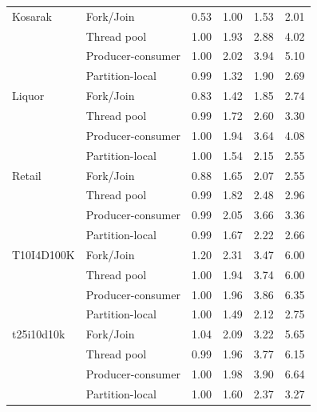 \documentclass[pdflatex,sn-vancouver-num]{sn-jnl}
\theoremstyle{thmstyleone}%
\theoremstyle{thmstyletwo}%
\theoremstyle{thmstylethree}%
\begin{document}
\begin{table}[p]
\begin{tabular}{llrrrr}
\addlinespace
Kosarak & Fork/Join & 0.53 & 1.00 & 1.53 & 2.01 \\
 & Thread pool & 1.00 & 1.93 & 2.88 & 4.02 \\
 & Producer-consumer & 1.00 & 2.02 & 3.94 & 5.10 \\
 & Partition-local & 0.99 & 1.32 & 1.90 & 2.69 \\
\addlinespace
Liquor & Fork/Join & 0.83 & 1.42 & 1.85 & 2.74 \\
 & Thread pool & 0.99 & 1.72 & 2.60 & 3.30 \\
 & Producer-consumer & 1.00 & 1.94 & 3.64 & 4.08 \\
 & Partition-local & 1.00 & 1.54 & 2.15 & 2.55 \\
\addlinespace
Retail & Fork/Join & 0.88 & 1.65 & 2.07 & 2.55 \\
 & Thread pool & 0.99 & 1.82 & 2.48 & 2.96 \\
 & Producer-consumer & 0.99 & 2.05 & 3.66 & 3.36 \\
 & Partition-local & 0.99 & 1.67 & 2.22 & 2.66 \\
\addlinespace
T10I4D100K & Fork/Join & 1.20 & 2.31 & 3.47 & 6.00 \\
 & Thread pool & 1.00 & 1.94 & 3.74 & 6.00 \\
 & Producer-consumer & 1.00 & 1.96 & 3.86 & 6.35 \\
 & Partition-local & 1.00 & 1.49 & 2.12 & 2.75 \\
\addlinespace
t25i10d10k & Fork/Join & 1.04 & 2.09 & 3.22 & 5.65 \\
 & Thread pool & 0.99 & 1.96 & 3.77 & 6.15 \\
 & Producer-consumer & 1.00 & 1.98 & 3.90 & 6.64 \\
 & Partition-local & 1.00 & 1.60 & 2.37 & 3.27 \\
\bottomrule
\end{tabular}
\end{table}
 
\end{document}
